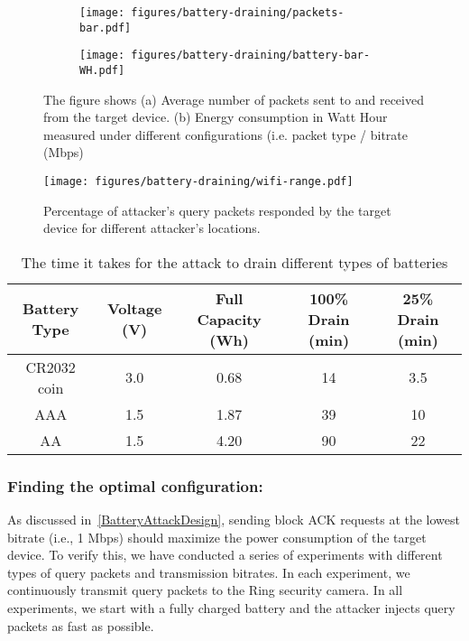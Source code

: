 \begin{figure}[t]
    \centering
    \begin{subfigure}[b]{0.35\textwidth}
    \texttt{[image: figures/battery-draining/packets-bar.pdf]}
    \caption{}
    \end{subfigure}
    \begin{subfigure}[b]{0.35\textwidth}
    \texttt{[image: figures/battery-draining/battery-bar-WH.pdf]}
    \caption{}
    \end{subfigure}
    \caption{The figure shows (a) Average number of packets sent to and received from the target device. (b) Energy consumption in Watt Hour measured under different configurations (i.e. packet type / bitrate (Mbps) }
    \label{fig:batteryDrain}
\end{figure}

\begin{figure*}[t]
    \centering
    \texttt{[image: figures/battery-draining/wifi-range.pdf]}
    \vspace{-10pt}
    \caption{Percentage of attacker's query packets responded by the target device for different attacker's locations.}
    \label{fig:battery-range-map}
\end{figure*}


\begin{table*}[t]
    \centering
    \begin{tabular}{|c|c|c|c|c|}
        \hline
        Battery Type & Voltage (V) & Full Capacity (Wh) & 100\% Drain  (min)  & 25\% Drain (min) \\
        \hline
        CR2032 coin & 3.0  &  0.68  &  14  & 3.5  \\
        AAA    & 1.5  &  1.87  &  39  & 10 \\
        AA     & 1.5  &  4.20  &  90  & 22\\
        \hline
    \end{tabular}
    \caption{The time it takes for the attack to drain different types of batteries}
    \label{tab:my_label}
\end{table*}

\subsubsection{Finding the optimal configuration:}
As discussed in~\ref{BatteryAttackDesign}, sending block ACK requests at the lowest bitrate (i.e., 1 Mbps) should maximize the power consumption of the target device. To verify this, we have conducted a series of experiments with different types of query packets and transmission bitrates. In each experiment, we continuously transmit query packets to the Ring security camera. In all experiments, we start with a fully charged battery and the attacker injects query packets as fast as possible.

